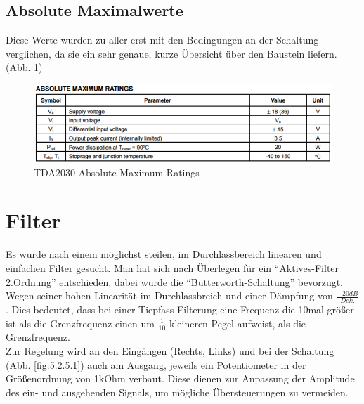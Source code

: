 \subsection{Absolute Maximalwerte}\label{subsec:3.2.1}
Diese Werte wurden zu aller erst mit den Bedingungen an der Schaltung verglichen, da sie ein sehr genaue, kurze Übersicht über den Baustein liefern. (Abb. \ref{fig:3.2.1.1})
\begin{figure} [H]
	\centering
	\includegraphics[width=1\textwidth]{img/Print5/TDA2030MaximumRatings.PNG}
	\caption{TDA2030-Absolute Maximum Ratings}
	\label {fig:3.2.1.1}
\end{figure}


\section{Filter}\label{sec:3.3}
Es wurde nach einem möglichst steilen, im Durchlassbereich linearen und einfachen Filter gesucht. Man hat sich nach Überlegen für ein \enquote{Aktives-Filter 2.Ordnung} entschieden, dabei wurde die \enquote{Butterworth-Schaltung} bevorzugt. Wegen seiner hohen Linearität im Durchlassbreich und einer Dämpfung von $\frac{-20dB}{Dek.}$ . Dies bedeutet, dass bei einer Tiepfass-Filterung eine Frequenz die 10mal größer ist als die Grenzfrequenz einen um $\frac{1}{10}$ kleineren Pegel aufweist, als die Grenzfrequenz.\\
Zur Regelung wird an den Eingängen (Rechts, Links) und bei der Schaltung (Abb. \ref{fig:5.2.5.1}) auch am Ausgang, jeweils ein Potentiometer in der Größenordnung von 1kOhm verbaut. Diese dienen zur Anpassung der Amplitude des ein- und ausgehenden Signals, um mögliche Übersteuerungen zu vermeiden.


